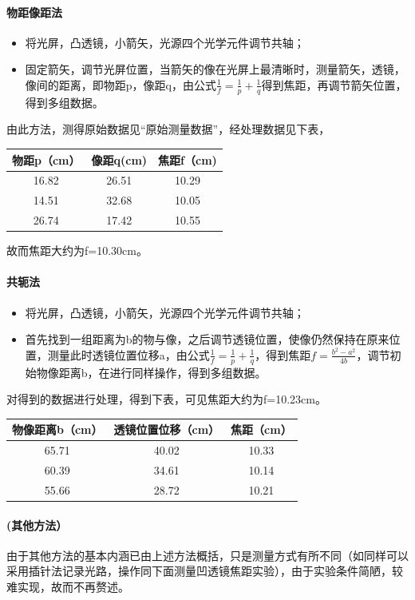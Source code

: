 \documentclass[UTF8]{ctexart}
\begin{document}
\paragraph{物距像距法}
\begin{itemize}
\item 将光屏，凸透镜，小箭矢，光源四个光学元件调节共轴；
\item 固定箭矢，调节光屏位置，当箭矢的像在光屏上最清晰时，测量箭矢，透镜，像间的距离，即物距p，像距q，由公式$\frac{1}{f}=\frac{1}{p}+\frac{1}{q}$得到焦距，再调节箭矢位置，得到多组数据。
\end{itemize}
由此方法，测得原始数据见“原始测量数据”，经处理数据见下表，
\begin{table}[htbp!] 
\centering 
\begin{tabular}{|c|c|c|} 
\hline 
 物距p（cm） &  像距q(cm)&焦距f（cm)  \\ 
\hline 
16.82 & 26.51&10.29  \\ 
\hline 
14.51 & 32.68 &10.05\\ 
\hline 
26.74 & 17.42 &10.55\\ 
\hline
\end{tabular} 
\end{table}
故而焦距大约为f=10.30cm。
\paragraph{共轭法}
\begin{itemize}
\item 将光屏，凸透镜，小箭矢，光源四个光学元件调节共轴；
\item 首先找到一组距离为b的物与像，之后调节透镜位置，使像仍然保持在原来位置，测量此时透镜位置位移a，由公式$\frac{1}{f}=\frac{1}{p}+\frac{1}{q}$，得到焦距$f=\frac{b^2-a^2}{4b}$，调节初始物像距离b，在进行同样操作，得到多组数据。
\end{itemize}
对得到的数据进行处理，得到下表，可见焦距大约为f=10.23cm。
\begin{table}[htbp!] 
\centering 
\begin{tabular}{|c|c|c|} 
\hline 
 物像距离b（cm） &  透镜位置位移（cm）&焦距（cm）  \\ 
\hline 
65.71 & 40.02 &10.33\\ 
\hline 
60.39 & 34.61 &10.14\\ 
\hline 
55.66 & 28.72 &10.21 \\ 
\hline
\end{tabular} 
\end{table}
\paragraph{(其他方法）}由于其他方法的基本内涵已由上述方法概括，只是测量方式有所不同（如同样可以采用插针法记录光路，操作同下面测量凹透镜焦距实验），由于实验条件简陋，较难实现，故而不再赘述。
\end{document}

